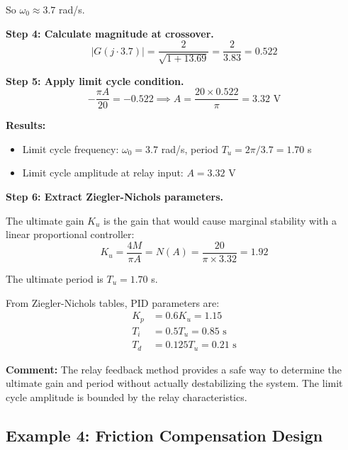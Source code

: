 \begin{example}
So $\omega_0 \approx 3.7$ rad/s.

\textbf{Step 4: Calculate magnitude at crossover.}
\begin{equation}
|G(j \cdot 3.7)| = \frac{2}{\sqrt{1+13.69}} = \frac{2}{3.83} = 0.522
\end{equation}

\textbf{Step 5: Apply limit cycle condition.}
\begin{equation}
-\frac{\pi A}{20} = -0.522 \implies A = \frac{20 \times 0.522}{\pi} = 3.32 \text{ V}
\end{equation}

\textbf{Results:}
\begin{itemize}
    \item Limit cycle frequency: $\omega_0 = 3.7$ rad/s, period $T_u = 2\pi/3.7 = 1.70$ s
    \item Limit cycle amplitude at relay input: $A = 3.32$ V
\end{itemize}

\textbf{Step 6: Extract Ziegler-Nichols parameters.}

The ultimate gain $K_u$ is the gain that would cause marginal stability with a linear proportional controller:
\begin{equation}
K_u = \frac{4M}{\pi A} = N(A) = \frac{20}{\pi \times 3.32} = 1.92
\end{equation}

The ultimate period is $T_u = 1.70$ s.

From Ziegler-Nichols tables, PID parameters are:
\begin{align}
K_p &= 0.6 K_u = 1.15 \\
T_i &= 0.5 T_u = 0.85 \text{ s} \\
T_d &= 0.125 T_u = 0.21 \text{ s}
\end{align}

\textbf{Comment:} The relay feedback method provides a safe way to determine the ultimate gain and period without actually destabilizing the system. The limit cycle amplitude is bounded by the relay characteristics.
\end{example}

\subsection{Example 4: Friction Compensation Design}

